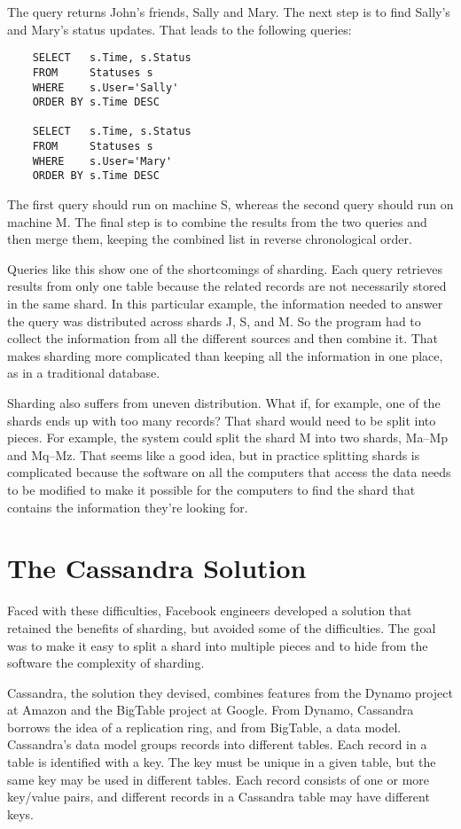 The query returns John's friends, Sally and Mary.
The next step is to find Sally's and Mary's status updates.
That leads to the following queries:
\begin{code}
\begin{verbatim}
	SELECT   s.Time, s.Status
	FROM     Statuses s
	WHERE    s.User='Sally'
	ORDER BY s.Time DESC

	SELECT   s.Time, s.Status
	FROM     Statuses s
	WHERE    s.User='Mary'
	ORDER BY s.Time DESC
\end{verbatim}
\end{code}

The first query should run on machine S,
whereas the second query should run on machine M.
The final step is to combine the results from the two queries
and then merge them, keeping
the combined list in reverse chronological order.

Queries like this show one of the shortcomings of sharding.
Each query retrieves results from only one table
because the related records
are not necessarily stored in the same shard.
In this particular example, the information needed to answer the query was
distributed across shards J, S, and M.
So the program had to collect the information
from all the different sources and then combine it.
That makes sharding more complicated
than keeping all the information in one place,
as in a traditional database.

Sharding also suffers from uneven distribution.
What if, for example, one of the shards ends up with too many records?
That shard would need to be split into pieces.
For example, the system could
split the shard M into two shards, Ma--Mp and Mq--Mz.
That seems like a good idea, but in practice splitting shards
is complicated because the software on all the computers that access the data
needs to be modified to make it possible for the computers
to find the shard that contains the information they're looking for.

\section{The Cassandra Solution}

Faced with these difficulties, Facebook engineers developed a solution that
retained the benefits of sharding, but avoided some of the difficulties.
The goal was to make it easy to split a shard into multiple pieces
and to hide from the software the complexity of sharding.

Cassandra, the solution they devised, combines features
from the Dynamo project at Amazon and the BigTable project at Google.
From Dynamo, Cassandra borrows the idea of a replication ring,
and from BigTable, a data model.
Cassandra's data model groups records into different tables.
Each record in a table is identified with a key.
The key must be unique in a given table,
but the same key may be used in different tables.
Each record consists of one or more key/value pairs, and
different records in a Cassandra table may have different keys.

